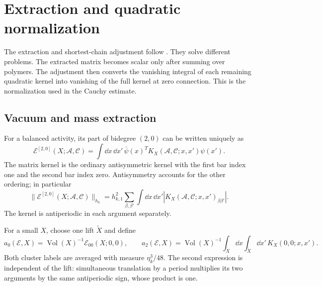 \section{Extraction and quadratic normalization}
\label{sec:extraction}

The extraction and shortest-chain adjustment follow
\cite[\S\S12.3,12.5]{QED3Manuscript}. They solve different problems.
The extracted matrix becomes scalar only after summing over polymers.
The adjustment then converts the vanishing integral of each remaining
quadratic kernel into vanishing of the full kernel at zero connection.
This is the normalization used in the Cauchy estimate.

\subsection{Vacuum and mass extraction}
\label{subsec:rg-extraction}

For a balanced activity, its part of bidegree $(2,0)$ can be
written uniquely as
\[
 \mathscr E^{[2,0]}(X;\mathscr A,\mathscr C)
   =\int\dd x\,\dd x'\,
             \bar\psi(x)^T K_X(\mathscr A,\mathscr C;x,x')\psi(x').
\]
The matrix kernel is the ordinary antisymmetric kernel with
the first bar index one and the second bar index zero.
Antisymmetry accounts for the other ordering; in particular
\begin{equation}\label{eq:rg-bilinear-norm}
 \|\mathscr E^{[2,0]}(X;\mathscr A,\mathscr C)\|_{h_k}
   =h_{k,1}^2\sum_{\beta,\beta'}\int\dd x\,\dd x'
                     |K_X(\mathscr A,\mathscr C;x,x')_{\beta\beta'}|.
\end{equation}
The kernel is antiperiodic in each argument separately.

For a small $X$, choose one lift $\widetilde X$ and define
\begin{equation}\label{eq:rg-local-extractions}
 a_0(\mathscr E,X)
       =\operatorname{Vol}(X)^{-1}\mathscr E_{00}(X;0,0),\qquad
 a_2(\mathscr E,X)
       =\operatorname{Vol}(X)^{-1}
             \int_{\widetilde X}\dd x\int_{\widetilde X}\dd x'\,
                                                    K_X(0,0;x,x').
\end{equation}
Both cluster labels are averaged with measure $\eta_k^3/48$.
The second expression is independent of the lift: simultaneous
translation by a period multiplies its two arguments by the
same antiperiodic sign, whose product is one.


